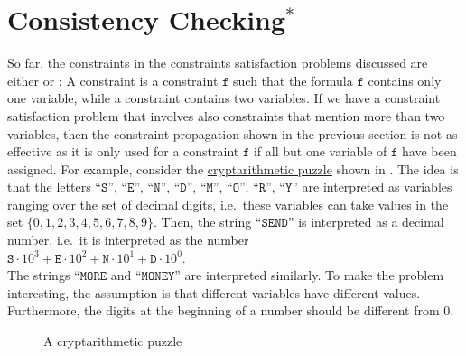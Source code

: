 \section{Consistency Checking$^*$ \label{sec:consistency}}
So far, the constraints in the constraints satisfaction problems discussed are either  
or :  A  constraint is a constraint $\texttt{f}$
such that the formula $\texttt{f}$ contains only one variable, while a  constraint
contains two variables.  If we have a constraint satisfaction problem that involves also constraints that
mention more than two variables, then the constraint propagation shown in the previous section is not
as effective as it is only used for a constraint $\texttt{f}$ if all but one variable of $\texttt{f}$ have been assigned.
For example, consider the \href{https://en.wikipedia.org/wiki/Verbal_arithmetic}{cryptarithmetic puzzle} shown
in .  The idea is that the letters 
``$\texttt{S}$'', ``$\texttt{E}$'', ``$\texttt{N}$'', ``$\texttt{D}$'', ``$\texttt{M}$'', ``$\texttt{O}$'', ``$\texttt{R}$'', ``$\texttt{Y}$'' 
are interpreted as variables ranging over the set of decimal digits, i.e.~these variables can take values in
the set $\{0,1,2,3,4,5,6,7,8,9\}$.  Then, the string ``$\texttt{SEND}$'' is interpreted as a decimal number,
i.e.~it is interpreted as the number
\\[0.2cm]
\hspace*{1.3cm}
$\texttt{S} \cdot 10^3 + \texttt{E} \cdot 10^2 + \texttt{N} \cdot 10^1 + \texttt{D} \cdot 10^0$.
\\[0.2cm]
The strings ``$\texttt{MORE}$ and ``$\texttt{MONEY}$'' are interpreted similarly. To make the problem
interesting, the assumption is that different variables have different values.  Furthermore, the
digits at the beginning of a number should be different from $0$.


\begin{figure}[!ht]
\centering
{}

\caption{A cryptarithmetic puzzle}
\label{fig:send-more-money.pdf}
\end{figure}


